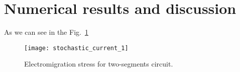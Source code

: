 \section{Numerical results and discussion}
  \label{sec:results}
As we can see in the Fig.~\ref{fig:stochastic_current_1}
\begin{figure}[h]
  \centering
  \texttt{[image: stochastic\_current\_1]}
  \caption{Electromigration stress for two-segments circuit.}
\label{fig:stochastic_current_1}
\end{figure}
